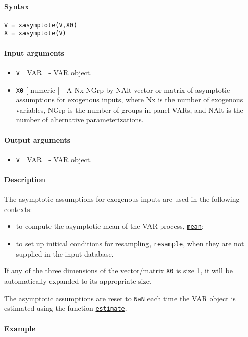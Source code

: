 


	\paragraph{Syntax}

\begin{verbatim}
V = xasymptote(V,X0)
X = xasymptote(V)
\end{verbatim}

\paragraph{Input arguments}

\begin{itemize}
\item
  \texttt{V} {[} VAR {]} - VAR object.
\item
  \texttt{X0} {[} numeric {]} - A Nx-NGrp-by-NAlt vector or matrix of
  asymptotic assumptions for exogenous inputs, where Nx is the number of
  exogenous variables, NGrp is the number of groups in panel VARs, and
  NAlt is the number of alternative parameterizations.
\end{itemize}

\paragraph{Output arguments}

\begin{itemize}
\itemsep1pt\parskip0pt
\item
  \texttt{V} {[} VAR {]} - VAR object.
\end{itemize}

\paragraph{Description}

The asymptotic assumptions for exogenous inputs are used in the
following contexts:

\begin{itemize}
\item
  to compute the asymptotic mean of the VAR process,
  \href{VAR/mean}{\texttt{mean}};
\item
  to set up initical conditions for resampling,
  \href{VAR/resample}{\texttt{resample}}, when they are not supplied in
  the input database.
\end{itemize}

If any of the three dimensions of the vector/matrix \texttt{X0} is size
1, it will be automatically expanded to its appropriate size.

The asymptotic assumptions are reset to \texttt{NaN} each time the VAR
object is estimated using the function
\href{VAR/estimate}{\texttt{estimate}}.

\paragraph{Example}


